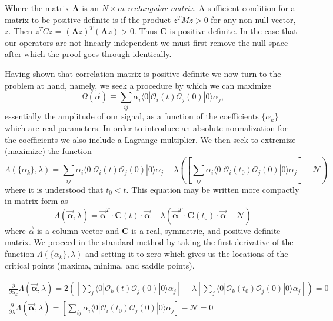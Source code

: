 Where the matrix $\mathbf{A}$ is an $N\times m$ \emph{rectangular matrix}. A sufficient condition for a matrix to be positive definite is if the product $z^T M z  >0 $ for any non-null vector, $z$. Then $z^T C z$ = $(\mathbf{A}z)^T (\mathbf{A}z) > 0$. Thus $\mathbf{C}$ is positive definite. In the case that our operators are not linearly independent we must first remove the null-space after which the proof goes through identically.   

Having shown that correlation matrix is positive definite we now turn to the problem at hand, namely, we seek a procedure by which we can maximize
\begin{equation}
\Omega(\vec{\alpha}) \equiv \sum_{ij} \alpha_i \langle 0 | \mathcal{O}_i(t) \mathcal{O}_j(0) | 0 \rangle \alpha_j,
\end{equation} 
 essentially the amplitude of our signal, as a function of the coefficients $\{\alpha_k\}$ which are real parameters. In order to introduce an absolute normalization for the coefficients we also include a Lagrange multiplier.  We then seek to extremize (maximize)  the function 
\begin{equation}
\Lambda( \{\alpha_k\} , \lambda ) = \sum_{ij} \alpha_i \langle 0 | \mathcal{O}_i(t) \mathcal{O}_j(0) | 0 \rangle \alpha_j - \lambda \left( \left[\sum_{ij} \alpha_i \langle 0 | \mathcal{O}_i(t_0) \mathcal{O}_j(0) | 0 \rangle \alpha_j \right] - \mathcal{N} \right)
\end{equation}
where it is understood that $t_0 < t$. This equation may be written more compactly in matrix form as 
\begin{equation*}
\Lambda( \vec{\mathbf{\alpha}} , \lambda) = \vec{\mathbf{\alpha}}^T\cdot \mathbf{C}(t) \cdot \vec{\mathbf{\alpha}} - \lambda \left(  \vec{\mathbf{\alpha}}^T\cdot \mathbf{C}(t_0) \cdot \vec{\mathbf{\alpha}} - \mathcal{N} \right)
\end{equation*} 
where $\vec{\alpha}$ is a column vector and $\mathbf{C}$ is a real, symmetric, and positive definite matrix. We proceed in the standard method by taking the first derivative of the function $\Lambda(\{\alpha_k\} , \lambda)$ and setting it to zero which gives us the locations of the critical points (maxima, minima, and saddle points). 

\begin{align*}
\frac{\partial}{\partial \alpha_k} \Lambda( \vec{\mathbf{\alpha}} , \lambda) = 2 \left( \left[\sum_j  \langle 0 | \mathcal{O}_k(t) \mathcal{O}_j(0) | 0 \rangle \alpha_j\right] - \lambda \left[\sum_j  \langle 0 | \mathcal{O}_k(t_0) \mathcal{O}_j(0) | 0 \rangle \alpha_j\right] \right)  = 0 \\
\frac{\partial}{\partial \lambda} \Lambda( \vec{\mathbf{\alpha}} , \lambda) = \left[\sum_{ij} \alpha_i \langle 0 | \mathcal{O}_i(t_0) \mathcal{O}_j(0) | 0 \rangle \alpha_j \right] - \mathcal{N} = 0
\end{align*}

